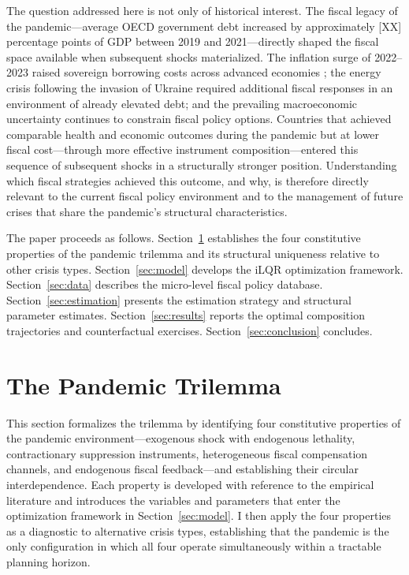 \documentclass[12pt, a4paper]{article}
\begin{document}

The question addressed here is not only of historical interest. The fiscal legacy of
the pandemic---average OECD government debt increased by approximately \textsc{[XX]}
percentage points of GDP between 2019 and 2021---directly shaped the fiscal space
available when subsequent shocks materialized. The inflation surge of 2022--2023
raised sovereign borrowing costs across advanced economies \citep{jorda2023}; the
energy crisis following the invasion of Ukraine required additional fiscal responses in
an environment of already elevated debt; and the prevailing macroeconomic uncertainty
continues to constrain fiscal policy options. Countries that achieved comparable
health and economic outcomes during the pandemic but at lower fiscal cost---through
more effective instrument composition---entered this sequence of subsequent shocks in
a structurally stronger position. Understanding which fiscal strategies achieved this
outcome, and why, is therefore directly relevant to the current fiscal policy
environment and to the management of future crises that share the pandemic's
structural characteristics.


The paper proceeds as follows. Section~\ref{sec:trilemma} establishes the four
constitutive properties of the pandemic trilemma and its structural uniqueness relative
to other crisis types. Section~\ref{sec:model} develops the iLQR optimization
framework. Section~\ref{sec:data} describes the micro-level fiscal policy database.
Section~\ref{sec:estimation} presents the estimation strategy and structural parameter
estimates. Section~\ref{sec:results} reports the optimal composition trajectories and
counterfactual exercises. Section~\ref{sec:conclusion} concludes.



\section{The Pandemic Trilemma}
\label{sec:trilemma}

This section formalizes the trilemma by identifying four constitutive properties of the pandemic environment---exogenous shock with endogenous lethality, contractionary suppression instruments, heterogeneous fiscal compensation channels, and endogenous fiscal feedback---and establishing their circular interdependence. Each property is developed with reference to the empirical literature and introduces the variables and parameters that enter the optimization framework in Section~\ref{sec:model}. I then apply the four properties as a
diagnostic to alternative crisis types, establishing that the pandemic is the only configuration in which all four operate simultaneously within a tractable planning horizon.
\end{document}
